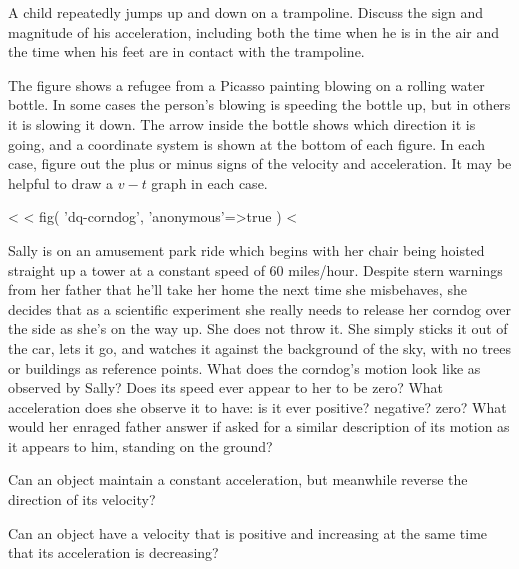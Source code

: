 \startdqs

\begin{dq}
A child repeatedly jumps up and down on a trampoline.
Discuss the sign and magnitude of his acceleration,
including both the time when he is in the air and the time
when his feet are in contact with the trampoline.
\end{dq}

\begin{dq}\label{dq:water-bottle}
The figure
shows a refugee from a Picasso painting
blowing on a rolling water bottle. In some cases the
person's blowing is speeding the bottle up, but in others it
is slowing it down. The arrow inside the bottle shows which
direction it is going, and a coordinate system is shown at
the bottom of each figure. In each case, figure out the plus
or minus signs of the velocity and acceleration. It may be
helpful to draw a $v-t$ graph in each case.
\end{dq}

<%
<%
  fig(
    'dq-corndog',
    {
      'anonymous'=>true
    }
  )
<%
\begin{dq}\label{dq:corndog}
Sally is on an amusement park ride which begins with her
chair being hoisted straight up a tower at a constant speed
of 60 miles/hour. Despite stern warnings from her father
that he'll take her home the next time she misbehaves, she
decides that as a scientific experiment she really needs to
release her corndog over the side as she's on the way up.
She does not throw it. She simply sticks it out of the car,
lets it go, and watches it against the background of the
sky, with no trees or buildings as reference points. What
does the corndog's motion look like as observed by Sally?
Does its speed ever appear to her to be zero? What
acceleration does she observe it to have: is it ever
positive? negative? zero? What would her enraged father
answer if asked for a similar description of its motion as
it appears to him, standing on the ground?
\end{dq}

\begin{dq}
Can an object maintain a constant acceleration, but
meanwhile reverse the direction of its velocity?
\end{dq}

\begin{dq}
Can an object have a velocity that is positive and
increasing at the same time that its acceleration is decreasing?
\end{dq}



